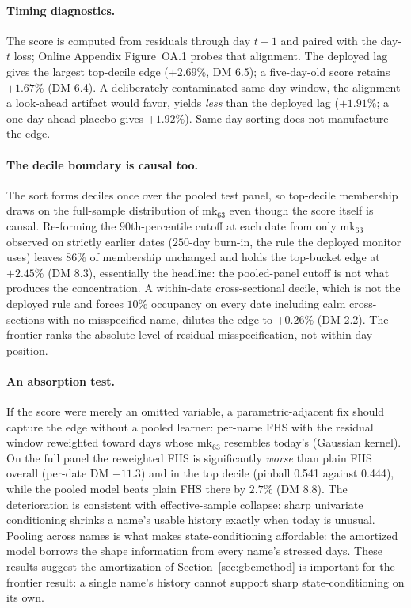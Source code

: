 \documentclass[11pt]{article}
\theoremstyle{remark}
\begin{document}
\paragraph{Timing diagnostics.} The score is computed from residuals
through day $t-1$ and paired with the day-$t$ loss; Online Appendix
Figure~OA.1 probes that alignment. The deployed lag gives the largest
top-decile edge ($+2.69\%$, DM 6.5); a five-day-old score retains
$+1.67\%$ (DM 6.4). A deliberately contaminated same-day window, the
alignment a look-ahead artifact would favor, yields \emph{less} than
the deployed lag ($+1.91\%$; a one-day-ahead placebo gives $+1.92\%$).
Same-day sorting does not manufacture the edge.

\paragraph{The decile boundary is causal too.} The sort forms deciles
once over the pooled test panel, so top-decile membership draws on the
full-sample distribution of mk$_{63}$ even though the score itself is
causal. Re-forming the $90$th-percentile cutoff at each date from only
mk$_{63}$ observed on strictly earlier dates ($250$-day burn-in, the
rule the deployed monitor uses) leaves $86\%$ of membership unchanged
and holds the top-bucket edge at $+2.45\%$ (DM 8.3), essentially the
headline: the pooled-panel cutoff is not what produces the
concentration. A within-date cross-sectional decile, which is not the
deployed rule and forces $10\%$ occupancy on every date including calm
cross-sections with no misspecified name, dilutes the edge to
$+0.26\%$ (DM 2.2). The frontier ranks the absolute level of residual
misspecification, not within-day position.

\paragraph{An absorption test.} If the score were merely an omitted
variable, a parametric-adjacent fix should capture the edge without a
pooled learner: per-name FHS with the residual window reweighted
toward days whose mk$_{63}$ resembles today's (Gaussian kernel). On
the full panel the reweighted FHS is significantly \emph{worse} than
plain FHS overall (per-date DM $-11.3$) and in the top decile (pinball
0.541 against 0.444), while the pooled model beats plain FHS there by
$2.7\%$ (DM 8.8). The deterioration is consistent with effective-sample collapse: sharp
univariate conditioning shrinks a name's usable history exactly when
today is unusual. Pooling across names is what makes state-conditioning affordable: the amortized model borrows the shape information from every name's
stressed days. These results suggest the amortization of Section~\ref{sec:gbcmethod} is
important for the frontier result: a single name's history cannot
support sharp state-conditioning on its own.
\end{document}
